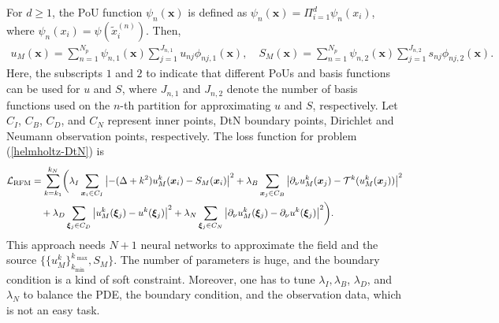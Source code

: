 \documentclass{article}
\theoremstyle{plain}
\theoremstyle{definition}
\begin{document}
For $d \ge 1$, the PoU function $\psi_n(\boldsymbol{x})$ is defined as $\psi_n(\boldsymbol{x})=\Pi_{i=1}^{d}\psi_n(x_{i})$, where $\psi_n(x_i) = \psi(\tilde{x}_i^{(n)})$.
Then,
\begin{align} \label{eq:u-S-approx}
u_{M}(\boldsymbol{x})=\sum_{n=1}^{N_p}\psi_{n,1}(\boldsymbol{x})\sum_{j=1}^{J_{n,1}}u_{nj}\phi_{nj,1}(\boldsymbol{x}), \quad S_{M}(\boldsymbol{x})=\sum_{n=1}^{N_p}\psi_{n,2}(\boldsymbol{x})\sum_{j=1}^{J_{n,2}}s_{nj}\phi_{nj,2}(\boldsymbol{x}).
\end{align}
 {Here, the subscripts $1$ and $2$ to indicate that different PoUs and basis functions can be used for $u$ and $S$, where $J_{n,1}$ and $J_{n,2}$ denote the number of basis functions used on the $n$-th partition for approximating $u$ and $S$, respectively.} 
Let $C_I$, $C_B$, $C_D$, and $C_N$ represent inner points, DtN boundary points, Dirichlet and Neumann observation points, respectively. 
 The loss function for problem (\ref{helmholtz-DtN}) is
\begin{align}
    \label{RFM_LOSS_inverse_source}
\mathcal{L}_{\text{RFM}}&=\sum_{k=k_1}^{k_N}
\biggl( \lambda_   I\sum_{\boldsymbol{x}_i \in C_I}\left|-(\Delta+k^2) u_{M}^{k}(\boldsymbol{x}_i)-S_{M}(\boldsymbol{x}_i)\right|^2
+\lambda_B\sum_{\boldsymbol{x}_j\in C_B}\left|\partial_{\nu} u^{k}_{M}(\boldsymbol{x}_j)-\mathcal{T}^{k}(u^{k}_{M}(\boldsymbol{x}_j))\right|^2 \notag\\
&{}\quad +\lambda_{D}\sum_{\boldsymbol{\xi}_j\in C_D}\left|u^{k}_{M}(\boldsymbol{\xi}_j)-u^{k}(\boldsymbol{\xi}_j)\right|^2
+\lambda_{N}\sum_{\boldsymbol{\xi}_j\in C_N}\left|\partial _{\nu}u^{k}_{M}(\boldsymbol{\xi}_j)-\partial_{\nu}u^{k}(\boldsymbol{\xi}_j)\right|^2 \biggr).
\end{align}
This approach needs $N+1$ neural networks to approximate the field and the source $\{\{u^{k}_{M}\}_{k_\text{min}}^{k_\text{ max}}, S_{M}\}$. The number of parameters is huge, and the boundary condition is a kind of soft constraint. Moreover, one has to tune $\lambda_I, \lambda_B$, $\lambda_D$, and $\lambda_N$ to balance the PDE, the boundary condition, and the observation data, which is not an easy task.
\end{document}
